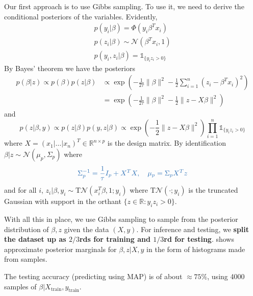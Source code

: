 \documentclass[11pt]{article}
\newcommand\RR{\mathbb{R}}
\newcommand{\calN}{\mathcal{N}}
\newcommand{\bluefont}{\color{darkblue}}
\begin{document}
Our first approach is to use Gibbs sampling. To use it, we need to derive the conditional posteriors of the variables.
Evidently,
\begin{align*}
	p(y_i|\beta)
	= \Phi(y_i\beta^Tx_i)  \\
	p(z_i | \beta)  \sim \calN(\beta^T x_i, 1)  \\
	p(y_i,z_i|\beta) = \mathds{1}_{\{y_iz_i > 0\}}
\end{align*}
By Bayes' theorem we have the posteriors
\begin{equation}
\begin{aligned}
	p(\beta|z) \propto p(\beta)p(z|\beta)
	&\propto \exp\left(
		-\frac1{2\tau}\|\beta\|^2
		-\frac{1}{2}\sum_{i=1}^{n}(z_i - \beta^T x_i)^2
	\right)  \\
	&= \exp\left(
		-\frac1{2\tau}\|\beta\|^2
		-\frac{1}{2}\|z - X\beta\|^2
	\right)
\end{aligned}
\end{equation}
and
\begin{equation}
	p(z|\beta,y) \propto p(z|\beta)p(y,z|\beta)
	\propto \exp\left(
	-\frac{1}{2}\|z - X\beta\|^2
	\right) \prod_{i=1}^{n} \mathds{1}_{\{y_iz_i > 0\}}
\end{equation}
where $X = (x_1|\ldots|x_n)^T \in \RR^{n \times p}$ is the design matrix. By identification $\beta|z \sim \calN(\mu_p, \Sigma_p)$ where
\begin{equation}\label{eq:BetaPostZ}
\bluefont
	\Sigma_p^{-1} = \frac{1}{\tau}I_p + X^TX,
	\quad
	\mu_p = \Sigma_p X^Tz
\end{equation}
and for all $i$, $\boxed{z_i|\beta,y_i \sim \mathrm{T}\calN(x_i^T\beta, 1; y_i)}$ where $\mathrm{T}\calN(\cdot; y_i)$ is the truncated Gaussian with support in the orthant $\{z\in\RR: y_iz_i > 0\}$.

With all this in place, we use Gibbs sampling to sample from the posterior distribution of $\beta,z$ given the data $(X,y)$.
For inference and testing, we \textbf{\boldmath split the dataset up as $2/3$rds for training and $1/3$rd for testing}.  shows approximate posterior marginals for $\beta,z | X,y$ in the form of histograms made from samples.

The testing accuracy (predicting using MAP) is of about $\approx 75\%$, using 4000 samples of $\beta|X_\mathrm{train},y_\mathrm{train}$.
\end{document}
